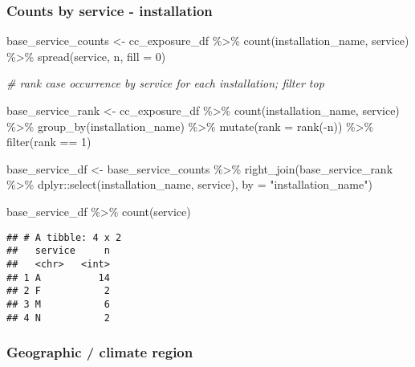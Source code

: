 \documentclass[
]{article}
\newenvironment{Shaded}{\begin{snugshade}}{\end{snugshade}}
\newcommand{\AttributeTok}[1]{\textcolor[rgb]{0.77,0.63,0.00}{#1}}
\newcommand{\CommentTok}[1]{\textcolor[rgb]{0.56,0.35,0.01}{\textit{#1}}}
\newcommand{\DecValTok}[1]{\textcolor[rgb]{0.00,0.00,0.81}{#1}}
\newcommand{\FunctionTok}[1]{\textcolor[rgb]{0.00,0.00,0.00}{#1}}
\newcommand{\NormalTok}[1]{#1}
\newcommand{\OtherTok}[1]{\textcolor[rgb]{0.56,0.35,0.01}{#1}}
\newcommand{\SpecialCharTok}[1]{\textcolor[rgb]{0.00,0.00,0.00}{#1}}
\newcommand{\StringTok}[1]{\textcolor[rgb]{0.31,0.60,0.02}{#1}}
\begin{document}
\hypertarget{counts-by-service---installation}{%
\subsubsection{Counts by service -
installation}\label{counts-by-service---installation}}

\begin{Shaded}
\begin{Highlighting}[]
\NormalTok{base\_service\_counts }\OtherTok{\textless{}{-}}
\NormalTok{  cc\_exposure\_df }\SpecialCharTok{\%\textgreater{}\%} 
    \FunctionTok{count}\NormalTok{(installation\_name, service) }\SpecialCharTok{\%\textgreater{}\%} 
    \FunctionTok{spread}\NormalTok{(service, n, }\AttributeTok{fill =} \DecValTok{0}\NormalTok{) }


\CommentTok{\# rank case occurrence by service for each installation; filter top}

\NormalTok{base\_service\_rank }\OtherTok{\textless{}{-}}
\NormalTok{  cc\_exposure\_df }\SpecialCharTok{\%\textgreater{}\%} 
    \FunctionTok{count}\NormalTok{(installation\_name, service) }\SpecialCharTok{\%\textgreater{}\%} 
    \FunctionTok{group\_by}\NormalTok{(installation\_name) }\SpecialCharTok{\%\textgreater{}\%} 
    \FunctionTok{mutate}\NormalTok{(}\AttributeTok{rank =} \FunctionTok{rank}\NormalTok{(}\SpecialCharTok{{-}}\NormalTok{n)) }\SpecialCharTok{\%\textgreater{}\%} 
    \FunctionTok{filter}\NormalTok{(rank }\SpecialCharTok{==} \DecValTok{1}\NormalTok{)}

\NormalTok{base\_service\_df }\OtherTok{\textless{}{-}}
\NormalTok{  base\_service\_counts }\SpecialCharTok{\%\textgreater{}\%} 
    \FunctionTok{right\_join}\NormalTok{(base\_service\_rank }\SpecialCharTok{\%\textgreater{}\%} 
\NormalTok{                 dplyr}\SpecialCharTok{::}\FunctionTok{select}\NormalTok{(installation\_name, service), }\AttributeTok{by =} \StringTok{"installation\_name"}\NormalTok{) }


\NormalTok{base\_service\_df }\SpecialCharTok{\%\textgreater{}\%} 
  \FunctionTok{count}\NormalTok{(service)}
\end{Highlighting}
\end{Shaded}

\begin{verbatim}
## # A tibble: 4 x 2
##   service     n
##   <chr>   <int>
## 1 A          14
## 2 F           2
## 3 M           6
## 4 N           2
\end{verbatim}

\hypertarget{geographic-climate-region}{%
\subsubsection{Geographic / climate
region}\label{geographic-climate-region}}
\end{document}

